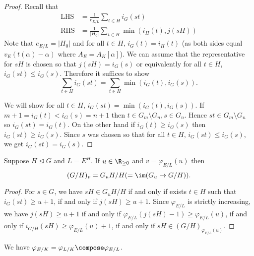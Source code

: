\documentclass[a4paper]{article}
\begin{document}
\begin{proof}
  Recall that
  \begin{align*}
    \mathrm{LHS} &= \frac{1}{e_{E/L}} \sum_{t \in H} i_G(st) \\
    \mathrm{RHS} &= \frac{1}{|H_0|} \sum_{t \in H} \min(i_H(t), j(sH))
  \end{align*}
  Note that \(e_{E/L} = |H_0|\) and for all \(t \in H\), \(i_G(t) = i_H(t)\) (as both sides equal \(v_E(t(\alpha) - \alpha)\) where \(A_E = A_K[\alpha]\)). We can assume that the representative for \(sH\) is chosen so that \(j(sH) = i_G(s)\) or equivalently for all \(t \in H\), \(i_G(st) \leq i_G(s)\). Therefore it suffices to show
  \[
    \sum_{t \in H} i_G(st) = \sum_{t \in H} \min(i_G(t), i_G(s)).
  \]

  We will show for all \(t \in H\), \(i_G(st) = \min(i_G(t), i_G(s))\). If \(m + 1 = i_G(t) < i_G(s) = n + 1\) then \(t \in G_m \setminus G_n, s \in G_n\). Hence \(st \in G_m \setminus G_n\) so \(i_G(st) = i_G(t)\). On the other hand if \(i_G(t) \geq i_G(s)\) then \(i_G(st) \geq i_G(s)\). Since \(s\) was chosen so that for all \(t \in H\), \(i_G(st) \leq i_G(s)\), we get \(i_G(st) = i_G(s)\).
\end{proof}

\begin{theorem}[Herbrand]
  Suppose \(H \trianglelefteq G\) and \(L = E^H\). If \(u \in \R_{\geq 0}\) and \(v = \varphi_{E/L}(u)\) then
  \[
    (G/H)_v = G_uH/H (= \im(G_u \to G/H)).
  \]
\end{theorem}

\begin{proof}
  For \(s \in G\), we have \(sH \in G_uH/H\) if and only if exists \(t \in H\) such that \(i_G(st) \geq u + 1\), if and only if \(j(sH) \geq u + 1\). Since \(\varphi_{E/L}\) is strictly increasing, we have \(j(sH) \geq u + 1\) if and only if \(\varphi_{E/L}(j(sH) - 1) \geq \varphi_{E/L}(u)\), if and only if \(i_{G/H}(sH) \geq \varphi_{E/L}(u) + 1\), if and only if \(sH \in (G/H)_{\varphi_{E/L}(u)}\).
\end{proof}

\begin{lemma}
  We have \(\varphi_{E/K} = \varphi_{L/K} \compose \varphi_{E/L}\).
\end{lemma}
\end{document}

